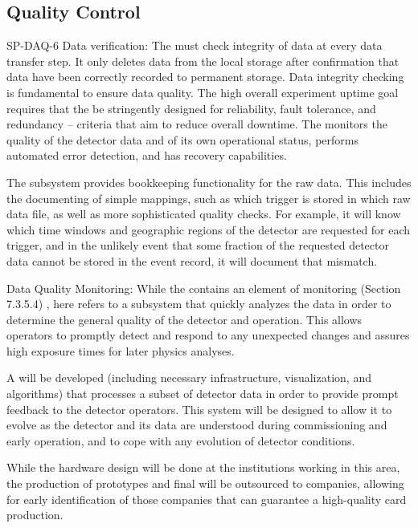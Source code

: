 \subsection{ Quality Control}

SP-DAQ-6 Data verification: The  must check integrity of data at
every data transfer step. It only deletes data from the local
storage after confirmation that data have been correctly recorded to
permanent storage. Data integrity checking is fundamental to ensure
data quality. The high overall experiment uptime goal requires that the  
be stringently designed for reliability, fault tolerance, and
redundancy  -- criteria that aim to reduce overall downtime. The 
monitors the quality of the detector data and of its own operational
status, performs automated error detection, and has recovery
capabilities.

The  subsystem provides bookkeeping
functionality for the raw data. This  includes the documenting of
simple mappings, such as which trigger is stored in which raw data
file, as well as more sophisticated quality checks. For example, it
will know which time windows and geographic regions of the detector
are requested for each trigger, and in the unlikely event that some
fraction of the requested detector data cannot be stored in the event
record, it will document that mismatch.

Data Quality Monitoring: While the  contains an element of
monitoring (Section 7.3.5.4) , here 
refers to a subsystem that quickly analyzes the data in order to
determine the general quality of the detector and  operation. This
 allows operators to promptly detect and respond to any
unexpected changes and assures high exposure times for later physics
analyses.

A   will be developed (including
necessary infrastructure, visualization, and algorithms) that 
processes a subset of detector data in order to provide prompt feedback
to the detector operators. This system will be designed to allow it to
evolve as the detector and its data are understood during
commissioning and early operation, and to cope with any evolution of
detector conditions.

While the hardware design will be done at the institutions working in
this area, the production of prototypes and final  will be
outsourced to companies, allowing for early identification of those
companies that can guarantee a high-quality card production.


